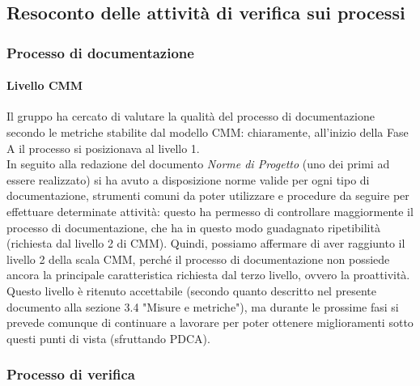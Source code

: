 \documentclass[../PianoDiQualifica.tex]{subfiles}
\begin{document}
\begin{appendices}
	\subsection{Resoconto delle attività di verifica sui processi}
		\subsubsection{Processo di documentazione}
			\paragraph{Livello CMM}
			Il gruppo ha cercato di valutare la qualità del processo di documentazione secondo le metriche stabilite dal modello CMM: chiaramente, all'inizio della Fase A il processo si posizionava al livello 1.\\
			In seguito alla redazione del documento \textit{Norme di Progetto} (uno dei primi ad essere realizzato) si ha avuto a disposizione norme valide per ogni tipo di documentazione, strumenti comuni da poter utilizzare e procedure da seguire per effettuare determinate attività: questo ha permesso di controllare maggiormente il processo di documentazione, che ha in questo modo guadagnato ripetibilità (richiesta dal livello 2 di CMM).
			Quindi, possiamo affermare di aver raggiunto il livello 2 della scala CMM, perché il processo di documentazione non possiede ancora la principale caratteristica richiesta dal terzo livello, ovvero la proattività.
			Questo livello è ritenuto accettabile (secondo quanto descritto nel presente documento alla sezione 3.4 "Misure e metriche"), ma durante le prossime fasi si prevede comunque di continuare a lavorare per poter ottenere miglioramenti sotto questi punti di vista (sfruttando PDCA).
		\subsubsection{Processo di verifica}

\end{appendices}
\end{document}
